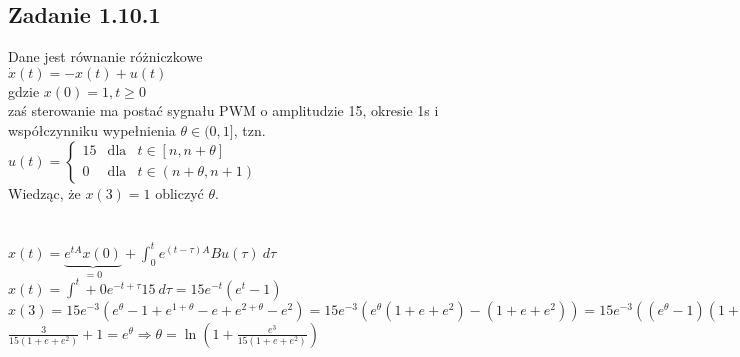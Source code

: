\pagebreak
\subsection*{Zadanie 1.10.1} {\color{darkgray}
	Dane jest równanie różniczkowe\\
	$\dot{x}(t)=-x(t)+u(t)$\\
	gdzie $x(0)=1, t\geqslant 0$\\
	zaś sterowanie ma postać sygnału PWM o amplitudzie 15, okresie 1s i współczynniku wypełnienia $\theta \in (0,1]$, tzn.\\
	$u(t)=\left\{ \begin{array}{ccl} 15 &\text{dla} & t\in [n,n+\theta] \\ 0 & \text{dla} &t \in(n+\theta, n+1)\end{array}\right.$\\
	Wiedząc, że $x(3)=1$ obliczyć $\theta$.\\
}\lineh
\\\\
$x(t)=\underbrace{e^{tA}x(0)}_{=0}+\int^t_0 e^{(t-\tau)A}Bu(\tau)\ d\tau$\\
$x(t)=\int^t+0 e^{-t+\tau}15 \ d\tau=15e^{-t}(e^{t}-1)$\\
$x(3)=15e^{-3}(e^\theta-1+e^{1+\theta}-e+e^{2+\theta}-e^2)=15e^{-3}(e^\theta(1+e+e^2)-(1+e+e^2))=15e^{-3}((e^\theta-1)(1+e+e^2))=\boxed{1}$\\
$\frac{3}{15(1+e+e^2)}+1=e^\theta \Rightarrow \boxed{\theta=\ln(1+\frac{e^3}{15(1+e+e^2)})}$\\

